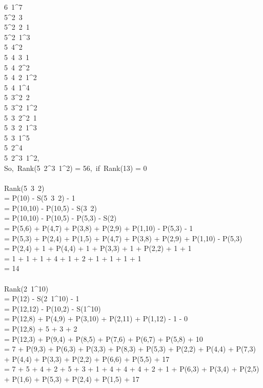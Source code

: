 \documentclass[11pt]{article} %
\begin{document}
\begin{enumerate}
\begin{enumerate}
			6\ 1^{7}\\
			5^{2}\ 3\\
			5^{2}\ 2\ 1\\
			5^{2}\ 1^{3}\\
			5\ 4^{2}\\
			5\ 4\ 3\ 1\\
			5\ 4\ 2^{2}\\
			5\ 4\ 2\ 1^{2}\\
			5\ 4\ 1^{4}\\
			5\ 3^{2}\ 2\\
			5\ 3^{2}\ 1^{2}\\
			5\ 3\ 2^{2}\ 1\\
			5\ 3\ 2\ 1^{3}\\
			5\ 3\ 1^{5}\\
			5\ 2^{4}\\
			5\ 2^{3}\ 1^{2},\\
			So,\ Rank(5\ 2^{3}\ 1^{2}) = 56,\ if\ Rank(13) = 0\\ 
			\\
			Rank(5\ 3\ 2)\\ 
			= P(10) - S(5\ 3\ 2) - 1\\
			= P(10,10) - P(10,5) - S(3\ 2)\\
			= P(10,10) - P(10,5) - P(5,3) - S(2)\\
			= P(5,6) + P(4,7) + P(3,8) + P(2,9) + P(1,10) - P(5,3) - 1\\
			= P(5,3) + P(2,4) + P(1,5) + P(4,7) + P(3,8) + P(2,9) + P(1,10) - P(5,3)\\
			= P(2,4) + 1 + P(4,4) + 1 + P(3,3) + 1 + P(2,2) + 1 + 1\\
			= 1 + 1 + 1 + 4 + 1 + 2 + 1 + 1 + 1 + 1\\
			= 14\\
			\\
			Rank(2\ 1^{10})\\
			= P(12) - S(2\ 1^{10}) - 1\\
			= P(12,12) - P(10,2) - S(1^{10}) \\
			= P(12,8) + P(4,9) + P(3,10) + P(2,11) + P(1,12) - 1 - 0\\
			= P(12,8) + 5 + 3 + 2\\
			= P(12,3) + P(9,4) + P(8,5) + P(7,6) + P(6,7) + P(5,8) + 10\\
			= 7 + P(9,3) + P(6,3) + P(3,3) + P(8,3) + P(5,3) + P(2,2) + P(4,4) + P(7,3) + P(4,4) + P(3,3) + P(2,2) + P(6,6) + P(5,5) + 17\\
			= 7 + 5 + 4 + 2 + 5 + 3 + 1 + 4 + 4 + 4 + 2 + 1 + P(6,3) + P(3,4) + P(2,5) + P(1,6) + P(5,3) + P(2,4) + P(1,5) + 17\\

\end{enumerate}
\end{enumerate}
\end{document}

